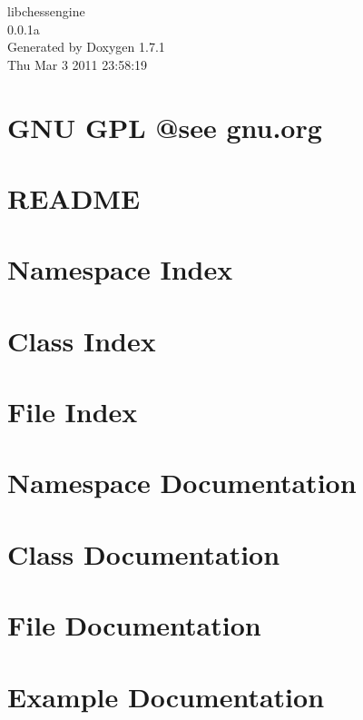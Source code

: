 \documentclass[a4paper]{book}
\begin{document}
\hypersetup{pageanchor=false}
\begin{titlepage}
\vspace*{7cm}
\begin{center}
{\Large libchessengine \\[1ex]\large 0.0.1a }\\
\vspace*{1cm}
{\large Generated by Doxygen 1.7.1}\\
\vspace*{0.5cm}
{\small Thu Mar 3 2011 23:58:19}\\
\end{center}
\end{titlepage}
\clearemptydoublepage
{}
\tableofcontents
\clearemptydoublepage
{}
\hypersetup{pageanchor=true}
\chapter{GNU GPL @see gnu.org}
\label{index}\hypertarget{index}{}
\chapter{README}
\label{README}
\hypertarget{README}{}

\chapter{Namespace Index}

\chapter{Class Index}

\chapter{File Index}

\chapter{Namespace Documentation}

\chapter{Class Documentation}




\chapter{File Documentation}


\chapter{Example Documentation}

\printindex
\end{document}
